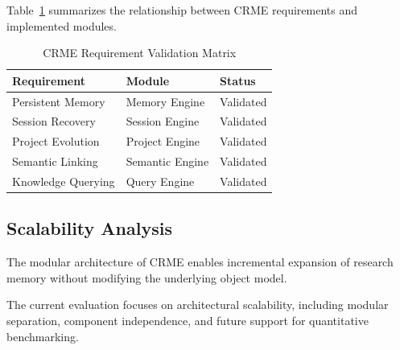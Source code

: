 Table~\ref{tab:validation_matrix} summarizes the relationship between
CRME requirements and implemented modules.


\begin{table}[t]

\caption{CRME Requirement Validation Matrix}

\label{tab:validation_matrix}


\centering
\small


\begin{tabular}{lll}

\toprule

Requirement &
Module &
Status
\\

\midrule


Persistent Memory &
Memory Engine &
Validated
\\


Session Recovery &
Session Engine &
Validated
\\


Project Evolution &
Project Engine &
Validated
\\


Semantic Linking &
Semantic Engine &
Validated
\\


Knowledge Querying &
Query Engine &
Validated
\\


\bottomrule


\end{tabular}


\end{table}




\subsection{Scalability Analysis}


The modular architecture of CRME enables incremental expansion
of research memory without modifying the underlying object model.

The current evaluation focuses on architectural scalability,
including modular separation, component independence, and future
support for quantitative benchmarking.



